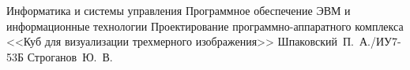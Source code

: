 \documentclass{bmstu}
\begin{document}
\renewcommand{\thelstlisting}{\arabic{lstlisting}}

\makecourseworktitle
    {Информатика и системы управления}
    {Программное обеспечение ЭВМ и информационные технологии}
    {Проектирование программно-аппаратного комплекса <<Куб для визуализации трехмерного изображения>>}
    {Шпаковский~П.~А./ИУ7-53Б}
    {Строганов~Ю.~В.}
    {}

\maketableofcontents








\makebibliography


\end{document}
